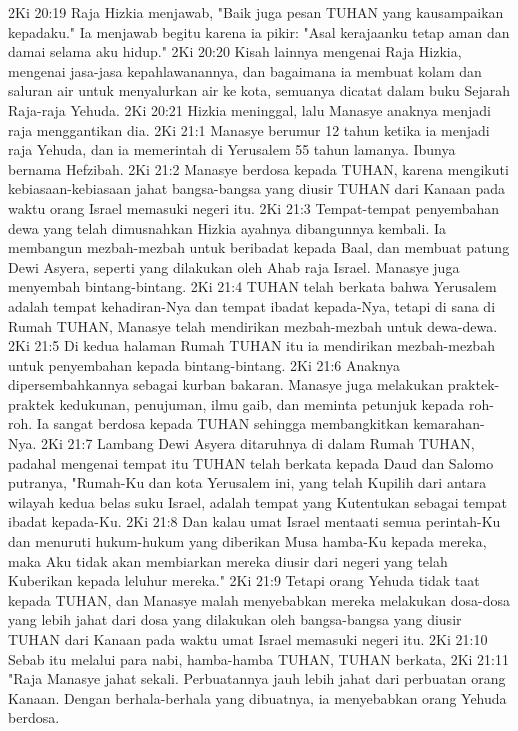 2Ki 20:19  Raja Hizkia menjawab, "Baik juga pesan TUHAN yang kausampaikan kepadaku." Ia menjawab begitu karena ia pikir: "Asal kerajaanku tetap aman dan damai selama aku hidup."
2Ki 20:20  Kisah lainnya mengenai Raja Hizkia, mengenai jasa-jasa kepahlawanannya, dan bagaimana ia membuat kolam dan saluran air untuk menyalurkan air ke kota, semuanya dicatat dalam buku Sejarah Raja-raja Yehuda.
2Ki 20:21  Hizkia meninggal, lalu Manasye anaknya menjadi raja menggantikan dia.
2Ki 21:1  Manasye berumur 12 tahun ketika ia menjadi raja Yehuda, dan ia memerintah di Yerusalem 55 tahun lamanya. Ibunya bernama Hefzibah.
2Ki 21:2  Manasye berdosa kepada TUHAN, karena mengikuti kebiasaan-kebiasaan jahat bangsa-bangsa yang diusir TUHAN dari Kanaan pada waktu orang Israel memasuki negeri itu.
2Ki 21:3  Tempat-tempat penyembahan dewa yang telah dimusnahkan Hizkia ayahnya dibangunnya kembali. Ia membangun mezbah-mezbah untuk beribadat kepada Baal, dan membuat patung Dewi Asyera, seperti yang dilakukan oleh Ahab raja Israel. Manasye juga menyembah bintang-bintang.
2Ki 21:4  TUHAN telah berkata bahwa Yerusalem adalah tempat kehadiran-Nya dan tempat ibadat kepada-Nya, tetapi di sana di Rumah TUHAN, Manasye telah mendirikan mezbah-mezbah untuk dewa-dewa.
2Ki 21:5  Di kedua halaman Rumah TUHAN itu ia mendirikan mezbah-mezbah untuk penyembahan kepada bintang-bintang.
2Ki 21:6  Anaknya dipersembahkannya sebagai kurban bakaran. Manasye juga melakukan praktek-praktek kedukunan, penujuman, ilmu gaib, dan meminta petunjuk kepada roh-roh. Ia sangat berdosa kepada TUHAN sehingga membangkitkan kemarahan-Nya.
2Ki 21:7  Lambang Dewi Asyera ditaruhnya di dalam Rumah TUHAN, padahal mengenai tempat itu TUHAN telah berkata kepada Daud dan Salomo putranya, "Rumah-Ku dan kota Yerusalem ini, yang telah Kupilih dari antara wilayah kedua belas suku Israel, adalah tempat yang Kutentukan sebagai tempat ibadat kepada-Ku.
2Ki 21:8  Dan kalau umat Israel mentaati semua perintah-Ku dan menuruti hukum-hukum yang diberikan Musa hamba-Ku kepada mereka, maka Aku tidak akan membiarkan mereka diusir dari negeri yang telah Kuberikan kepada leluhur mereka."
2Ki 21:9  Tetapi orang Yehuda tidak taat kepada TUHAN, dan Manasye malah menyebabkan mereka melakukan dosa-dosa yang lebih jahat dari dosa yang dilakukan oleh bangsa-bangsa yang diusir TUHAN dari Kanaan pada waktu umat Israel memasuki negeri itu.
2Ki 21:10  Sebab itu melalui para nabi, hamba-hamba TUHAN, TUHAN berkata,
2Ki 21:11  "Raja Manasye jahat sekali. Perbuatannya jauh lebih jahat dari perbuatan orang Kanaan. Dengan berhala-berhala yang dibuatnya, ia menyebabkan orang Yehuda berdosa.
